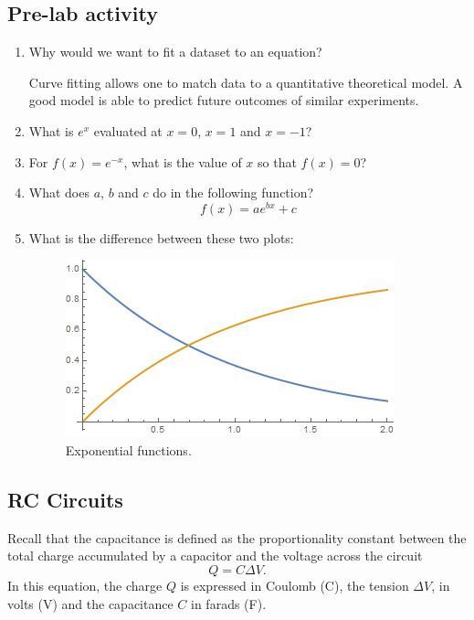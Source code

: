 \documentclass[12pt]{report}
\begin{document}
\subsection{Pre-lab activity}
\begin{enumerate}
\item Why would we want to fit a dataset to an equation?
\begin{tcolorbox}[title=Answer]
Curve fitting allows one to match data to a quantitative theoretical model. A good model is able to predict future outcomes of similar experiments.
\end{tcolorbox}
\item What is $e^{x}$ evaluated at $x=0$, $x=1$ and $x=-1$?
\item For $f(x) = e^{-x}$, what is the value of $x$ so that $f(x)=0$?
\item What does $a$, $b$ and $c$ do in the following function?
\begin{equation}
f(x) = a e^{b x}+c
\end{equation}
\item What is the difference between these two plots:
\begin{figure}[h]
\centering
\includegraphics[width=0.7\linewidth]{lab2-prelab}
\caption{Exponential functions.}
\label{Fig:lab2-prelab}
\end{figure}
\end{enumerate}

\subsection{RC Circuits}
Recall that the capacitance is defined as the proportionality constant between the total charge accumulated by a capacitor and the voltage across the circuit
\begin{equation}
Q = C \Delta V.
\end{equation}
In this equation, the charge $Q$ is expressed in Coulomb (C), the tension $\Delta V$, in volts (V) and the capacitance $C$ in farads (F).
\end{document}
